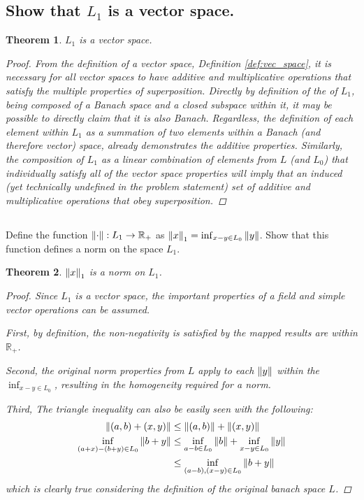 \documentclass[]{article}
\newcommand{\R}{\mathbb{R}}
\newtheorem{theorem}{Theorem}
\begin{document}
\subsection{Show that $L_1$ is a vector space.}
\begin{theorem}
    $L_1$ is a vector space.
    \begin{proof}
        From the definition of a vector space, Definition \ref{def:vec_space}, it is necessary for all vector spaces to have additive and multiplicative operations that satisfy the multiple properties of superposition.
        Directly by definition of the of $L_1$, being composed of a Banach space and a closed subspace within it, it may be possible to directly claim that it is also Banach. Regardless, the definition of each element within $L_1$ as a summation of two elements within a Banach (and therefore vector) space, already demonstrates the additive properties. Similarly, the composition of $L_1$ as a linear combination of elements from $L$ (and $L_0$) that individually satisfy all of the vector space properties will imply that an induced (yet technically undefined in the problem statement) set of additive and multiplicative operations that obey superposition.
    \end{proof}
\end{theorem}

\subsection{}
Define the function $\norm{\cdot} : L_1 \to \R_{+}$ as $\norm{x}_1 = \inf_{x - y \in L_0} \norm{y}$. 
Show that this function defines a norm on the space $L_1$.

\begin{theorem}
    $\norm{x}_1$ is a norm on $L_1$.
    \begin{proof}
        Since $L_1$ is a vector space, the important properties of a field and simple vector operations can be assumed.

        First, by definition, the non-negativity is satisfied by the mapped results are within $\R_+$.

        Second, the original norm properties from $L$ apply to each  $\norm{y}$ within the $\inf_{x-y \in L_0}$, resulting in the homogeneity required for a norm.

        Third, The triangle inequality can also be easily seen with the following:
        \begin{align*}
            \norm{(a,b) + (x,y)} 
                &\leq \norm{(a,b)} + \norm{(x,y)}\\
            \inf_{(a+x) - (b+y) \in L_0} \norm{b+y}
                &\leq \inf_{a - b \in L_0} \norm{b} + \inf_{x-y \in L_0} \norm{y}\\
                &\leq \inf_{(a-b), (x-y) \in L_0} \norm{b + y}
        \end{align*}
        which is clearly true considering the definition of the original banach space $L$.
    \end{proof}
\end{theorem}
\end{document}

